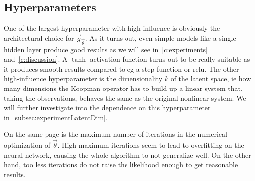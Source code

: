 	\subsection{Hyperparameters}
		One of the largest hyperparameter with high influence is obviously the architectural choice for \( \vec{g}_{\vec{\theta}} \). As it turns out, even simple models like a single hidden layer produce good results as we will see in~\autoref{c:experiments} and~\autoref{c:discussion}. A \( \tanh \) activation function turns out to be really suitable as it produces smooth results compared to \ac{eg} a step function or \ac{relu}. The other high-influence hyperparameter is the dimensionality \(k\) of the latent space, \ac{ie} how many dimensions the Koopman operator has to build up a linear system that, taking the observations, behaves the same as the original nonlinear system. We will further investigate into the dependence on this hyperparameter in~\autoref{subsec:experimentLatentDim}.

		On the same page is the maximum number of iterations in the numerical optimization of \( \vec{\theta} \). High maximum iterations seem to lead to overfitting on the neural network, causing the whole algorithm to not generalize well. On the other hand, too less iterations do not raise the likelihood enough to get reasonable results.

